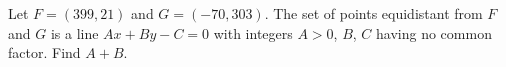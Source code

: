 Let $F=(399,21)$ and $G=(-70,303)$. The set of points equidistant from $F$ and $G$ is a line $Ax+By-C=0$ with integers $A>0$, $B$, $C$ having no common factor. Find $A+B$.
